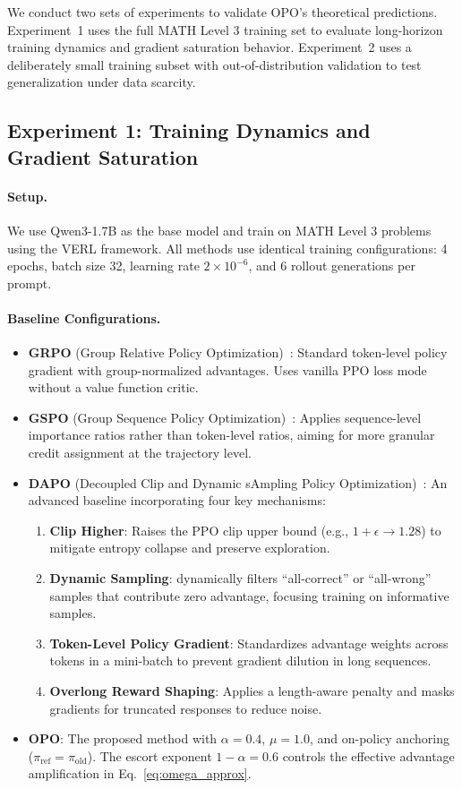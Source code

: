 \documentclass[11pt]{article}
\theoremstyle{definition}
\theoremstyle{remark}
\newcommand{\piref}{\pi_{\mathrm{ref}}}
\begin{document}
We conduct two sets of experiments to validate OPO's theoretical predictions. Experiment~1 uses the full MATH Level 3 training set to evaluate long-horizon training dynamics and gradient saturation behavior. Experiment~2 uses a deliberately small training subset with out-of-distribution validation to test generalization under data scarcity.

\subsection{Experiment 1: Training Dynamics and Gradient Saturation}

\paragraph{Setup.} We use Qwen3-1.7B as the base model and train on MATH Level 3 problems using the VERL framework. All methods use identical training configurations: 4 epochs, batch size 32, learning rate $2 \times 10^{-6}$, and 6 rollout generations per prompt.

\paragraph{Baseline Configurations.}
\begin{itemize}
    \item \textbf{GRPO} (Group Relative Policy Optimization)~\cite{Shao2024GRPO}: Standard token-level policy gradient with group-normalized advantages. Uses vanilla PPO loss mode without a value function critic.
    \item \textbf{GSPO} (Group Sequence Policy Optimization)~\cite{Zheng2025GSPO}: Applies sequence-level importance ratios rather than token-level ratios, aiming for more granular credit assignment at the trajectory level.
    \item \textbf{DAPO} (Decoupled Clip and Dynamic sAmpling Policy Optimization)~\cite{Yu2025DAPO}: An advanced baseline incorporating four key mechanisms:
    \begin{enumerate}
        \item \textbf{Clip Higher}: Raises the PPO clip upper bound (e.g., $1+\epsilon \to 1.28$) to mitigate entropy collapse and preserve exploration.
        \item \textbf{Dynamic Sampling}: dynamically filters ``all-correct'' or ``all-wrong'' samples that contribute zero advantage, focusing training on informative samples.
        \item \textbf{Token-Level Policy Gradient}: Standardizes advantage weights across tokens in a mini-batch to prevent gradient dilution in long sequences.
        \item \textbf{Overlong Reward Shaping}: Applies a length-aware penalty and masks gradients for truncated responses to reduce noise.
    \end{enumerate}
    \item \textbf{OPO}: The proposed method with $\alpha = 0.4$, $\mu = 1.0$, and on-policy anchoring ($\piref = \pi_{\text{old}}$). The escort exponent $1-\alpha = 0.6$ controls the effective advantage amplification in Eq.~\eqref{eq:omega_approx}.
\end{itemize}
\end{document}
